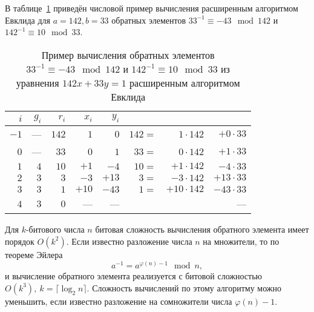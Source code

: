 \example
В таблице~\ref{tab:extended-euclid-inverse} приведён числовой пример вычисления расширенным алгоритмом Евклида для $a=142, b=33$ обратных элементов $33^{-1} \equiv -43 \mod 142$ и $142^{-1} \equiv 10 \mod 33$.

\begin{table}[!ht]
    \centering
    \caption{Пример вычисления обратных элементов $33^{-1} \equiv -43 \mod 142$ и $142^{-1} \equiv 10 \mod 33$ из уравнения $142 x + 33 y = 1$ расширенным алгоритмом Евклида\label{tab:extended-euclid-inverse}}
    \begin{tabular}{|r|r|r|r|r|rrr|}
        \hline
        $i$ & $g_i$ & $r_i$ & $x_i$ & $y_i$ & & & \\
        \hline
        $-1$ &  --- & $142$ &   $1$ &   $0$ & $142 =$ & $  1 \cdot 142$ & $ + 0 \cdot 33$ \\
	 $0$ &  --- &  $33$ &   $0$ &   $1$ &  $33 =$ & $  0 \cdot 142$ & $ + 1 \cdot 33$ \\
	 $1$ &  $4$ &  $10$ &  $+1$ &  $-4$ &  $10 =$ & $ +1 \cdot 142$ & $ - 4 \cdot 33$ \\
	 $2$ &  $3$ &   $3$ &  $-3$ & $+13$ &   $3 =$ & $ -3 \cdot 142$ & $+ 13 \cdot 33$ \\
	 $3$ &  $3$ &   $1$ & $+10$ & $-43$ &   $1 =$ & $+10 \cdot 142$ & $- 43 \cdot 33$ \\
	 $4$ &  $3$ &   $0$ &   --- &   --- & & & --- \\
        \hline
    \end{tabular}
\end{table}
\exampleend

Для $k$-битового числа $n$ битовая сложность вычисления обратного элемента имеет порядок $O(k^2)$. Если известно разложение числа $n$ на множители, то по теореме Эйлера
    \[ a^{-1} = a^{\varphi(n) - 1} \mod n, \]
и вычисление обратного элемента реализуется с битовой сложностью $O(k^3),~ k = \lceil \log_2 n \rceil$. Сложность вычислений по этому алгоритму можно уменьшить, если известно разложение на сомножители числа $\varphi(n) - 1$.
